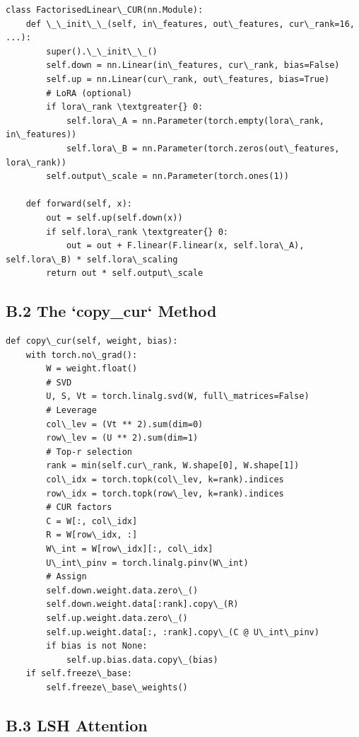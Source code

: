 \begin{lstlisting}
class FactorisedLinear\_CUR(nn.Module):
    def \_\_init\_\_(self, in\_features, out\_features, cur\_rank=16, ...):
        super().\_\_init\_\_()
        self.down = nn.Linear(in\_features, cur\_rank, bias=False)
        self.up = nn.Linear(cur\_rank, out\_features, bias=True)
        # LoRA (optional)
        if lora\_rank \textgreater{} 0:
            self.lora\_A = nn.Parameter(torch.empty(lora\_rank, in\_features))
            self.lora\_B = nn.Parameter(torch.zeros(out\_features, lora\_rank))
        self.output\_scale = nn.Parameter(torch.ones(1))
    
    def forward(self, x):
        out = self.up(self.down(x))
        if self.lora\_rank \textgreater{} 0:
            out = out + F.linear(F.linear(x, self.lora\_A), self.lora\_B) * self.lora\_scaling
        return out * self.output\_scale
\end{lstlisting}

\subsection{B.2 The `copy\_cur` Method}

\begin{lstlisting}
def copy\_cur(self, weight, bias):
    with torch.no\_grad():
        W = weight.float()
        # SVD
        U, S, Vt = torch.linalg.svd(W, full\_matrices=False)
        # Leverage
        col\_lev = (Vt ** 2).sum(dim=0)
        row\_lev = (U ** 2).sum(dim=1)
        # Top-r selection
        rank = min(self.cur\_rank, W.shape[0], W.shape[1])
        col\_idx = torch.topk(col\_lev, k=rank).indices
        row\_idx = torch.topk(row\_lev, k=rank).indices
        # CUR factors
        C = W[:, col\_idx]
        R = W[row\_idx, :]
        W\_int = W[row\_idx][:, col\_idx]
        U\_int\_pinv = torch.linalg.pinv(W\_int)
        # Assign
        self.down.weight.data.zero\_()
        self.down.weight.data[:rank].copy\_(R)
        self.up.weight.data.zero\_()
        self.up.weight.data[:, :rank].copy\_(C @ U\_int\_pinv)
        if bias is not None:
            self.up.bias.data.copy\_(bias)
    if self.freeze\_base:
        self.freeze\_base\_weights()
\end{lstlisting}

\subsection{B.3 LSH Attention}

